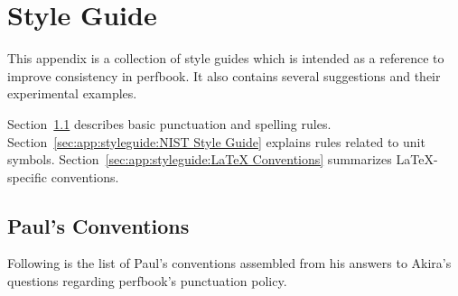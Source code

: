 
\chapter{Style Guide}
\label{chp:app:styleguide:Style Guide}

This appendix is a collection of style guides which is intended
as a reference to improve consistency in perfbook. It also contains
several suggestions and their experimental examples.

Section~\ref{sec:app:styleguide:Paul's Conventions} describes basic
punctuation and spelling rules.
Section~\ref{sec:app:styleguide:NIST Style Guide} explains rules
related to unit symbols.
Section~\ref{sec:app:styleguide:LaTeX Conventions} summarizes
\LaTeX-specific conventions.

\section{Paul's Conventions}
\label{sec:app:styleguide:Paul's Conventions}

Following is the list of Paul's conventions assembled from his
answers to Akira's questions regarding perfbook's punctuation policy.

